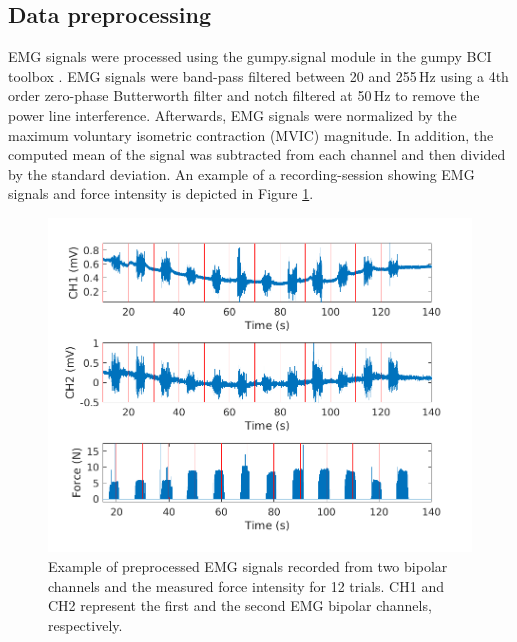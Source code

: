 \documentclass[journal,article,submit,moreauthors,pdftex,10pt,a4paper]{Definitions/mdpi}
\begin{document}
\subsection{Data preprocessing}
EMG signals were processed using the gumpy.signal module in the gumpy BCI toolbox \cite{31}. EMG signals were band-pass filtered between 20 and 255\,Hz  using a 4th order zero-phase Butterworth filter and notch filtered at 50\,Hz  to remove the power line interference. Afterwards, EMG signals were normalized by the maximum voluntary isometric contraction (MVIC) magnitude. In addition, the computed mean of the signal was subtracted from each channel and then divided by the standard deviation. An example of a recording-session showing EMG signals and force intensity is depicted in Figure \ref{FIG:TwoFiguresFile.png}.  
\begin{figure}[H]
    \centering
    \includegraphics [width=0.8\linewidth]{TwoFiguresFile.png}
    \caption{Example of preprocessed EMG signals recorded  from two bipolar channels and the measured force intensity for 12 trials. CH1 and CH2 represent the first and the second EMG bipolar channels, respectively.
}
    \label{FIG:TwoFiguresFile.png}
\end{figure}
\end{document}
